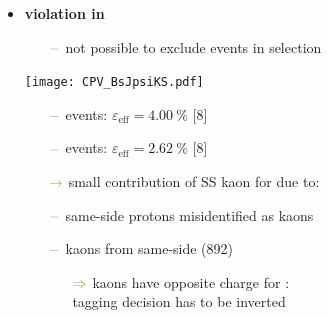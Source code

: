 {\begin{minipage}{0.474\boxwidth}
\begin{itemize}

\item\textbf{\CP violation in \BsToJPsiKS}
	\begin{itemize}
	\setlength\itemsep{0.01em}
	\setlength{\itemindent}{-.11in}
	\item[${\color{tu_gruen}-}$] not possible to exclude \Bd events in selection
	\end{itemize}
	
\vspace{-1.9em}
\begin{flushleft}
\texttt{[image: CPV\_BsJpsiKS.pdf]}
\end{flushleft}
\vspace{-2.4em}

	\begin{itemize}
	\setlength\itemsep{0.01em}
	\setlength{\itemindent}{-.11in}
	\item[${\color{tu_gruen}-}$] \Bs events: $\varepsilon_\text{eff}=\SI{4.00}{\%}$ [8]
	\item[${\color{tu_gruen}-}$] \Bd events: $\varepsilon_\text{eff}=\SI{2.62}{\%}$ [8]
	\setlength{\itemindent}{.05in}
	\item[${\color{tu_gruen}\rightarrow}$] small contribution of SS kaon for \Bd due to:
	\setlength{\itemindent}{.10in}
	\item[${\color{tu_gruen}-}$] same-side protons misidentified as kaons
	\item[${\color{tu_gruen}-}$] kaons from same-side \Kstar(892)
	\vspace{-0.35em}
		\begin{itemize}[leftmargin=.05in]
		\item[${\color{tu_gruen}\Rightarrow}$] kaons have opposite charge for \Bd:\\ tagging decision has to be inverted
		\end{itemize}
	\end{itemize}


%
%
\end{itemize}


\end{minipage}}
